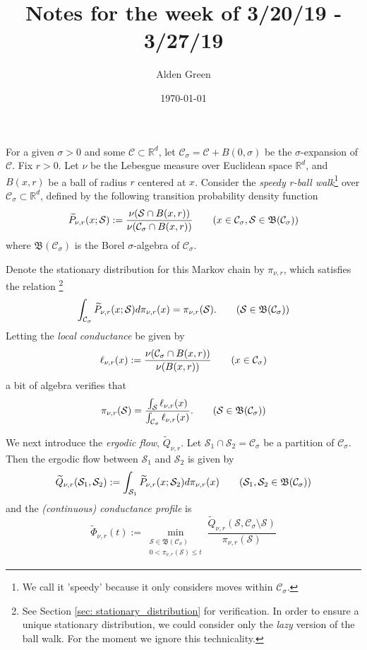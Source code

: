 \documentclass{article}
\newcommand{\Reals}{\mathbb{R}}
\newcommand{\Rd}{\Reals^d}
\newcommand{\Cset}{\mathcal{C}}
\newcommand{\Sset}{\mathcal{S}}
\newcommand{\Csig}{\Cset_{\sigma}}
\newcommand{\1}{\mathbf{1}}
\theoremstyle{alden}
\theoremstyle{aldenthm}
\theoremstyle{remark}
\begin{document}
	
\title{Notes for the week of 3/20/19 - 3/27/19}
\author{Alden Green}
\date{\today}
\maketitle

For a given $\sigma > 0$ and some $\Cset \subset \Rd$, let $\Csig = \Cset + B(0,\sigma)$ be the $\sigma$-expansion of $\Cset$. Fix $r > 0$. Let $\nu$ be the Lebesgue measure over Euclidean space $\Rd$, and $B(x,r)$ be a ball of radius $r$ centered at $x$. Consider the \emph{speedy r-ball walk}\footnote{We call it 'speedy' because it only considers moves within $\Csig$.} over $\Csig \subset \Rd$, defined by the following transition probability density function 
\begin{equation*}
\widetilde{P}_{\nu,r}(x; \Sset) := \frac{\nu(\Sset \cap B(x,r))}{\nu(\Csig \cap B(x,r))} \tag{$x \in \Csig, \Sset \in \mathfrak{B}(\Csig)$}
\end{equation*}
where $\mathfrak{B}(\Csig)$ is the Borel $\sigma$-algebra of $\Csig$. 

Denote the stationary distribution for this Markov chain by $\pi_{\nu,r}$, which satisfies the relation \footnote{See Section \ref{sec: stationary_distribution} for verification. In order to ensure a unique stationary distribution, we could consider only the \emph{lazy} version of the ball walk. For the moment we ignore this technicality.}
\begin{equation*}
\int_{\Csig} \widetilde{P}_{\nu,r}(x; \Sset) d\pi_{\nu,r}(x) = \pi_{\nu,r}(\Sset).  \tag{$\Sset \in \mathfrak{B}(\Csig)$}
\end{equation*}
Letting the \emph{local conductance} be given by
\begin{equation*}
\ell_{\nu,r}(x) := \frac{\nu(\Csig \cap B(x,r))}{\nu(B(x,r))} \tag{$x \in \Csig$}
\end{equation*}
a bit of algebra verifies that
\begin{equation*}
\pi_{\nu,r}(\Sset) = \frac{\int_{\Sset} \ell_{\nu,r}(x)}{\int_{\Csig} \ell_{\nu,r}(x)}. \tag{$\Sset \in \mathfrak{B}(\Csig)$}
\end{equation*}

We next introduce the \emph{ergodic flow}, $\widetilde{Q}_{\nu,r}$. Let $\Sset_1 \cap \Sset_2 = \Csig$ be a partition of $\Csig$. Then the ergodic flow between $\Sset_1$ and $\Sset_2$ is given by 
\begin{equation*}
\widetilde{Q}_{\nu,r}(\Sset_1, \Sset_2) := \int_{\Sset_1} \widetilde{P}_{\nu,r}(x; \Sset_2) d\pi_{\nu,r}(x) \tag{$\Sset_1, \Sset_2 \in \mathfrak{B}(\Csig)$}
\end{equation*}
and the \emph{(continuous) conductance profile} is
\begin{equation*}
\widetilde{\Phi}_{\nu,r}(t) := \min_{\substack{\Sset \in \mathfrak{B}(\Csig) \\ 0 < \pi_{\nu,r}(\Sset) \leq t} } \frac{\widetilde{Q}_{\nu,r}(\Sset, \Csig \setminus \Sset)}{\pi_{\nu,r}(\Sset)} \tag{$0 < t \leq 1/2 $}
\end{equation*}
\end{document}
